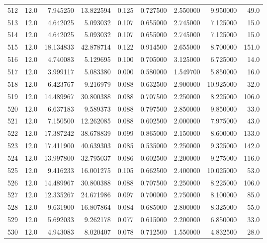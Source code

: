 \begin{tabular}{lrrrrrrrr}
512  &   12.0 &   7.945250 &  13.822594 &  0.125 &  0.727500 &  2.550000 &   9.950000 &   49.0 \\
513  &   12.0 &   4.642025 &   5.093032 &  0.107 &  0.655000 &  2.745000 &   7.125000 &   15.0 \\
514  &   12.0 &   4.642025 &   5.093032 &  0.107 &  0.655000 &  2.745000 &   7.125000 &   15.0 \\
515  &   12.0 &  18.134833 &  42.878714 &  0.122 &  0.914500 &  2.655000 &   8.700000 &  151.0 \\
516  &   12.0 &   4.740083 &   5.129695 &  0.100 &  0.705000 &  3.125000 &   6.725000 &   14.0 \\
517  &   12.0 &   3.999117 &   5.083380 &  0.000 &  0.580000 &  1.549700 &   5.850000 &   16.0 \\
518  &   12.0 &   6.423767 &   9.216979 &  0.088 &  0.632500 &  2.900000 &  10.925000 &   32.0 \\
519  &   12.0 &  14.489967 &  30.800388 &  0.088 &  0.707500 &  2.250000 &   8.225000 &  106.0 \\
520  &   12.0 &   6.637183 &   9.589373 &  0.088 &  0.797500 &  2.850000 &   9.850000 &   33.0 \\
521  &   12.0 &   7.150500 &  12.262085 &  0.088 &  0.602500 &  2.000000 &   7.975000 &   43.0 \\
522  &   12.0 &  17.387242 &  38.678839 &  0.099 &  0.865000 &  2.150000 &   8.600000 &  133.0 \\
523  &   12.0 &  17.411900 &  40.639303 &  0.085 &  0.535000 &  2.250000 &   9.325000 &  142.0 \\
524  &   12.0 &  13.997800 &  32.795037 &  0.086 &  0.602500 &  2.200000 &   9.275000 &  116.0 \\
525  &   12.0 &   9.416233 &  16.001275 &  0.105 &  0.662500 &  2.400000 &  10.025000 &   53.0 \\
526  &   12.0 &  14.489967 &  30.800388 &  0.088 &  0.707500 &  2.250000 &   8.225000 &  106.0 \\
527  &   12.0 &  12.335267 &  24.671986 &  0.097 &  0.700000 &  2.750000 &   8.100000 &   85.0 \\
528  &   12.0 &   9.631900 &  16.807864 &  0.084 &  0.685000 &  2.800000 &   8.325000 &   55.0 \\
529  &   12.0 &   5.692033 &   9.262178 &  0.077 &  0.615000 &  2.200000 &   6.850000 &   33.0 \\
530  &   12.0 &   4.943083 &   8.020407 &  0.078 &  0.712500 &  1.550000 &   4.832500 &   28.0 \\

\end{tabular}
